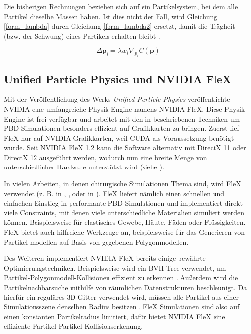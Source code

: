 Die bisherigen Rechnungen beziehen sich auf ein Partikelsystem, bei dem alle Partikel dieselbe Massen haben. Ist dies nicht der Fall, wird Gleichung \ref{form_lambda} durch Gleichung \ref{form_lambda2} ersetzt, damit die Trägheit (bzw. der Schwung) eines Partikels erhalten bleibt \cite{PBD}.

\begin{equation}
\Delta \textbf{p}_i = \lambda w_i \nabla_{p_i} C(\textbf{p})
\label{form_lambda2}
\end{equation}

\subsection{Unified Particle Physics und NVIDIA FleX}

Mit der Veröffentlichung des Werks \textit{Unified Particle Physics} \cite{UPP} veröffentlichte NVIDIA eine umfangreiche Physik Engine namens NVIDIA FleX.  Diese Physik Engine ist frei verfügbar und arbeitet mit den in \cite{UPP} beschriebenen Techniken um PBD-Simulationen besonders effizient auf Grafikkarten zu bringen.
Zuerst lief FleX nur auf NVIDIA Grafikkarten, weil CUDA als Voraussetzung benötigt wurde. Seit NVIDIA FleX 1.2 kann die Software alternativ mit DirectX 11 oder DirectX 12 ausgeführt werden, wodurch nun eine breite Menge von unterschiedlicher Hardware unterstützt wird (siehe \cite{FlexD3D}).

In vielen Arbeiten, in denen chirurgische Simulationen Thema sind, wird FleX verwendet (z. B. in \cite{BreastBiopsy}, \cite{PBDKidney}, \cite{VRSim20} oder in \cite{VRRobSim}). FleX liefert nämlich einen schnellen und einfachen Einstieg in performante PBD-Simulationen und implementiert direkt viele \linebreak  Constraints, mit denen viele unterschiedliche Materialien simuliert werden können. Beispielsweise für elastisches Gewebe, Häute, Fäden oder Flüssigkeiten. FleX bietet auch hilfreiche Werkzeuge an, beispielsweise für das Generieren von Partikel-modellen auf Basis von gegebenen Polygonmodellen.

Des Weiteren implementiert NVIDIA FleX bereits einige bewährte Optimierungstechniken. Beispielsweise wird ein BVH Tree verwendet, um Partikel-Polygonmodell-Kollisionen effizient zu erkennen \cite{FlexD3D}. Außerdem wird die Partikelnachbarsuche mithilfe von räumlichen Datenstrukturen beschleunigt. Da hierfür ein reguläres 3D Gitter verwendet wird, müssen alle Partikel aus einer Simulationsszene denselben Radius besitzen \cite{UPP}. FleX Simulationen sind also auf einen konstanten Partikelradius limitiert, dafür bietet NVIDIA FleX eine effiziente Partikel-Partikel-Kollisionserkenung.

